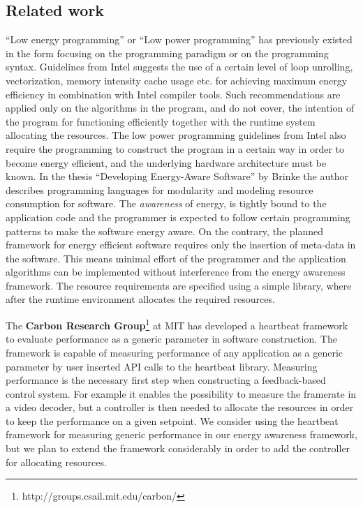 \documentclass{article}
\begin{document}
\subsection{Related work}
``Low energy programming'' or ``Low power programming'' has previously existed in the form focusing on the programming paradigm or on the programming syntax. 
Guidelines from Intel \cite{IntelLowPower} suggests the use of a certain level of loop unrolling, vectorization, memory intensity cache usage etc.
for achieving maximum energy efficiency in combination with Intel compiler tools. 
Such recommendations are applied only on the algorithms in the program, and do not cover, the intention of the program for functioning efficiently together with the runtime system allocating the resources. 
The low power programming guidelines from Intel also require the programming to construct the program in a certain way in order to become energy efficient, 
and the underlying hardware architecture must be known. 
In the thesis ``Developing Energy-Aware Software'' by Brinke \cite{Brinke:15} the author describes programming languages for modularity and modeling resource consumption for software.
The \textit{awareness} of energy, is tightly bound to the application code and the programmer is expected to follow certain programming patterns to make the software energy aware.
On the contrary, the planned framework for energy efficient software requires only the insertion of meta-data in the software.
This means minimal effort of the programmer and the application algorithms can be implemented without interference from the energy awareness framework.
The resource requirements are specified using a simple library, where after the runtime environment allocates the required resources.

The \textbf{Carbon Research Group}\footnote{http://groups.csail.mit.edu/carbon/} at MIT has developed a heartbeat framework to evaluate performance as a generic parameter in software construction. The framework is capable of measuring performance of any application as a generic parameter by user inserted API calls to the heartbeat library. Measuring performance is the necessary first step when constructing a feedback-based control system. For example it enables the possibility to measure the framerate in a video decoder, but a controller is then needed to allocate the resources in order to keep the performance on a given setpoint. We consider using the heartbeat framework for measuring generic performance in our energy awareness framework, but we plan to extend the framework considerably in order to add the controller for allocating resources.\\
\end{document}
